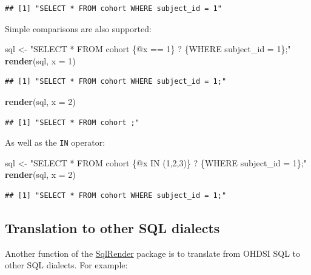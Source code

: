 \documentclass[11pt]{book}
\newenvironment{Shaded}{\begin{snugshade}}{\end{snugshade}}
\newcommand{\DataTypeTok}[1]{\textcolor[rgb]{0.13,0.29,0.53}{#1}}
\newcommand{\DecValTok}[1]{\textcolor[rgb]{0.00,0.00,0.81}{#1}}
\newcommand{\KeywordTok}[1]{\textcolor[rgb]{0.13,0.29,0.53}{\textbf{#1}}}
\newcommand{\NormalTok}[1]{#1}
\newcommand{\StringTok}[1]{\textcolor[rgb]{0.31,0.60,0.02}{#1}}
\theoremstyle{definition}
\theoremstyle{definition}
\theoremstyle{definition}
\theoremstyle{remark}
\begin{document}
\begin{verbatim}
## [1] "SELECT * FROM cohort WHERE subject_id = 1"
\end{verbatim}

Simple comparisons are also supported:

\begin{Shaded}
\begin{Highlighting}[]
\NormalTok{sql <-}\StringTok{ "SELECT * FROM cohort \{@x == 1\} ? \{WHERE subject_id = 1\};"}
\KeywordTok{render}\NormalTok{(sql, }\DataTypeTok{x =} \DecValTok{1}\NormalTok{)}
\end{Highlighting}
\end{Shaded}

\begin{verbatim}
## [1] "SELECT * FROM cohort WHERE subject_id = 1;"
\end{verbatim}

\begin{Shaded}
\begin{Highlighting}[]
\KeywordTok{render}\NormalTok{(sql, }\DataTypeTok{x =} \DecValTok{2}\NormalTok{)}
\end{Highlighting}
\end{Shaded}

\begin{verbatim}
## [1] "SELECT * FROM cohort ;"
\end{verbatim}

As well as the \texttt{IN} operator:

\begin{Shaded}
\begin{Highlighting}[]
\NormalTok{sql <-}\StringTok{ "SELECT * FROM cohort \{@x IN (1,2,3)\} ? \{WHERE subject_id = 1\};"}
\KeywordTok{render}\NormalTok{(sql, }\DataTypeTok{x =} \DecValTok{2}\NormalTok{)}
\end{Highlighting}
\end{Shaded}

\begin{verbatim}
## [1] "SELECT * FROM cohort WHERE subject_id = 1;"
\end{verbatim}

\hypertarget{translation-to-other-sql-dialects}{%
\subsection{Translation to other SQL dialects}\label{translation-to-other-sql-dialects}}

Another function of the \href{https://ohdsi.github.io/SqlRender/}{SqlRender} package is to translate from OHDSI SQL to other SQL dialects. For example:
\end{document}

